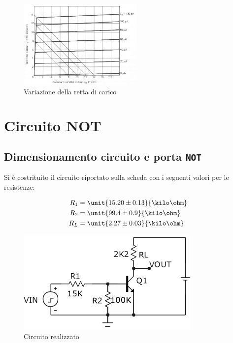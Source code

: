 \documentclass[10pt,a4paper]{article}
\def\code#1{\texttt{#1}}
\begin{document}
\begin{figure}[h!]
	\centering
	\includegraphics[width=0.54\textwidth]{../grafici/spostamento_retta.jpg}
	\caption{Variazione della retta di carico}
	\label{retta_spostamento}
\end{figure}
\section{Circuito NOT}

\subsection{Dimensionamento circuito e porta \code{NOT}}

Si è costrituito il circuito riportato sulla scheda con i seguenti valori per le resistenze:
\begin{figure}[h!]
	\begin{minipage}[c]{0.5\textwidth}
		\begin{align*}
		R_1 &= \unit{15.20 \pm 0.13}{\kilo\ohm}\\
		R_2 &= \unit{99.4 \pm 0.9}{\kilo\ohm}\\
		R_L &= \unit{2.27 \pm 0.03}{\kilo\ohm}\\
		\end{align*}
	\end{minipage}
	\begin{minipage}[c]{0.5\textwidth}
		\centering
		\includegraphics[width=0.8\textwidth]{../grafici/circuito_NOT.jpg}
		\caption{Circuito realizzato}
		\label{circuitoNOT}
	\end{minipage}
\end{figure}
\end{document}
